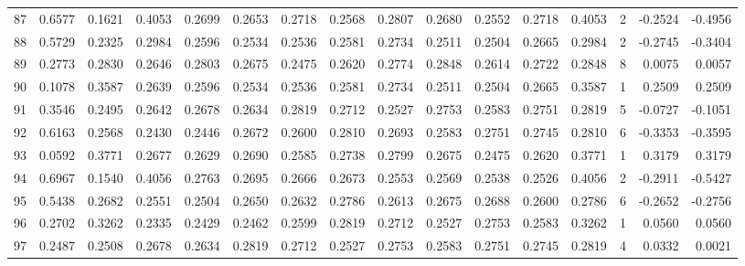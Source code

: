 \begin{tabular}{lrrrrrrrrrrrrrrr}
87  &      0.6577 &  0.1621 &  0.4053 &  0.2699 &  0.2653 &  0.2718 &  0.2568 &  0.2807 &  0.2680 &  0.2552 &   0.2718 &     0.4053 &      2 &                   -0.2524 &                    -0.4956 \\
88  &      0.5729 &  0.2325 &  0.2984 &  0.2596 &  0.2534 &  0.2536 &  0.2581 &  0.2734 &  0.2511 &  0.2504 &   0.2665 &     0.2984 &      2 &                   -0.2745 &                    -0.3404 \\
89  &      0.2773 &  0.2830 &  0.2646 &  0.2803 &  0.2675 &  0.2475 &  0.2620 &  0.2774 &  0.2848 &  0.2614 &   0.2722 &     0.2848 &      8 &                    0.0075 &                     0.0057 \\
90  &      0.1078 &  0.3587 &  0.2639 &  0.2596 &  0.2534 &  0.2536 &  0.2581 &  0.2734 &  0.2511 &  0.2504 &   0.2665 &     0.3587 &      1 &                    0.2509 &                     0.2509 \\
91  &      0.3546 &  0.2495 &  0.2642 &  0.2678 &  0.2634 &  0.2819 &  0.2712 &  0.2527 &  0.2753 &  0.2583 &   0.2751 &     0.2819 &      5 &                   -0.0727 &                    -0.1051 \\
92  &      0.6163 &  0.2568 &  0.2430 &  0.2446 &  0.2672 &  0.2600 &  0.2810 &  0.2693 &  0.2583 &  0.2751 &   0.2745 &     0.2810 &      6 &                   -0.3353 &                    -0.3595 \\
93  &      0.0592 &  0.3771 &  0.2677 &  0.2629 &  0.2690 &  0.2585 &  0.2738 &  0.2799 &  0.2675 &  0.2475 &   0.2620 &     0.3771 &      1 &                    0.3179 &                     0.3179 \\
94  &      0.6967 &  0.1540 &  0.4056 &  0.2763 &  0.2695 &  0.2666 &  0.2673 &  0.2553 &  0.2569 &  0.2538 &   0.2526 &     0.4056 &      2 &                   -0.2911 &                    -0.5427 \\
95  &      0.5438 &  0.2682 &  0.2551 &  0.2504 &  0.2650 &  0.2632 &  0.2786 &  0.2613 &  0.2675 &  0.2688 &   0.2600 &     0.2786 &      6 &                   -0.2652 &                    -0.2756 \\
96  &      0.2702 &  0.3262 &  0.2335 &  0.2429 &  0.2462 &  0.2599 &  0.2819 &  0.2712 &  0.2527 &  0.2753 &   0.2583 &     0.3262 &      1 &                    0.0560 &                     0.0560 \\
97  &      0.2487 &  0.2508 &  0.2678 &  0.2634 &  0.2819 &  0.2712 &  0.2527 &  0.2753 &  0.2583 &  0.2751 &   0.2745 &     0.2819 &      4 &                    0.0332 &                     0.0021 \\

\end{tabular}
